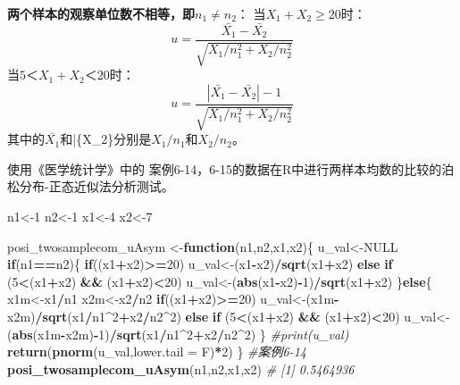 \documentclass[
]{article}
\newenvironment{Shaded}{\begin{snugshade}}{\end{snugshade}}
\newcommand{\CommentTok}[1]{\textcolor[rgb]{0.56,0.35,0.01}{\textit{#1}}}
\newcommand{\ControlFlowTok}[1]{\textcolor[rgb]{0.13,0.29,0.53}{\textbf{#1}}}
\newcommand{\DataTypeTok}[1]{\textcolor[rgb]{0.13,0.29,0.53}{#1}}
\newcommand{\DecValTok}[1]{\textcolor[rgb]{0.00,0.00,0.81}{#1}}
\newcommand{\KeywordTok}[1]{\textcolor[rgb]{0.13,0.29,0.53}{\textbf{#1}}}
\newcommand{\NormalTok}[1]{#1}
\newcommand{\OperatorTok}[1]{\textcolor[rgb]{0.81,0.36,0.00}{\textbf{#1}}}
\newcommand{\OtherTok}[1]{\textcolor[rgb]{0.56,0.35,0.01}{#1}}
\newcommand{\StringTok}[1]{\textcolor[rgb]{0.31,0.60,0.02}{#1}}
\begin{document}
\textbf{两个样本的观察单位数不相等，即\(n_1≠n_2\)}：
当\(X_1+X_2≥20\)时：
\[u=\frac{\bar{X_1}-\bar{X_2}}{\sqrt{X_1/n_1^2+X_2/n_2^2}}\]
当\(5＜X_1+X_2＜20\)时：
\[u=\frac{|\bar{X_1}-\bar{X_2}|-1}{\sqrt{X_1/n_1^2+X_2/n_2^2}}\]
其中的\(\bar{X_1}\)和\bar\{X\_2\}分别是\(X_1/n_1\)和\(X_2/n_2\)。

使用《医学统计学》中的 案例6-14，6-15的数据在R中进行两样本均数的比较的泊松分布-正态近似法分析测试。

\begin{Shaded}
\begin{Highlighting}[]
\NormalTok{n1<-}\DecValTok{1}
\NormalTok{n2<-}\DecValTok{1}
\NormalTok{x1<-}\DecValTok{4}
\NormalTok{x2<-}\DecValTok{7}

\NormalTok{posi_twosamplecom_uAsym <-}\ControlFlowTok{function}\NormalTok{(n1,n2,x1,x2)\{}
\NormalTok{  u_val<-}\OtherTok{NULL}
  \ControlFlowTok{if}\NormalTok{(n1}\OperatorTok{==}\NormalTok{n2)\{}
    \ControlFlowTok{if}\NormalTok{((x1}\OperatorTok{+}\NormalTok{x2)}\OperatorTok{>=}\DecValTok{20}\NormalTok{)}
\NormalTok{      u_val<-(x1}\OperatorTok{-}\NormalTok{x2)}\OperatorTok{/}\KeywordTok{sqrt}\NormalTok{(x1}\OperatorTok{+}\NormalTok{x2)}
    \ControlFlowTok{else} \ControlFlowTok{if}\NormalTok{ (}\DecValTok{5}\OperatorTok{<}\NormalTok{(x1}\OperatorTok{+}\NormalTok{x2) }\OperatorTok{&&}\StringTok{ }\NormalTok{(x1}\OperatorTok{+}\NormalTok{x2)}\OperatorTok{<}\DecValTok{20}\NormalTok{) }
\NormalTok{      u_val<-(}\KeywordTok{abs}\NormalTok{(x1}\OperatorTok{-}\NormalTok{x2)}\OperatorTok{-}\DecValTok{1}\NormalTok{)}\OperatorTok{/}\KeywordTok{sqrt}\NormalTok{(x1}\OperatorTok{+}\NormalTok{x2)}
\NormalTok{  \}}\ControlFlowTok{else}\NormalTok{\{}
\NormalTok{    x1m<-x1}\OperatorTok{/}\NormalTok{n1}
\NormalTok{    x2m<-x2}\OperatorTok{/}\NormalTok{n2}
     \ControlFlowTok{if}\NormalTok{((x1}\OperatorTok{+}\NormalTok{x2)}\OperatorTok{>=}\DecValTok{20}\NormalTok{)}
\NormalTok{      u_val<-(x1m}\OperatorTok{-}\NormalTok{x2m)}\OperatorTok{/}\KeywordTok{sqrt}\NormalTok{(x1}\OperatorTok{/}\NormalTok{n1}\OperatorTok{^}\DecValTok{2}\OperatorTok{+}\NormalTok{x2}\OperatorTok{/}\NormalTok{n2}\OperatorTok{^}\DecValTok{2}\NormalTok{)}
    \ControlFlowTok{else} \ControlFlowTok{if}\NormalTok{ (}\DecValTok{5}\OperatorTok{<}\NormalTok{(x1}\OperatorTok{+}\NormalTok{x2) }\OperatorTok{&&}\StringTok{ }\NormalTok{(x1}\OperatorTok{+}\NormalTok{x2)}\OperatorTok{<}\DecValTok{20}\NormalTok{) }
\NormalTok{      u_val<-(}\KeywordTok{abs}\NormalTok{(x1m}\OperatorTok{-}\NormalTok{x2m)}\OperatorTok{-}\DecValTok{1}\NormalTok{)}\OperatorTok{/}\KeywordTok{sqrt}\NormalTok{(x1}\OperatorTok{/}\NormalTok{n1}\OperatorTok{^}\DecValTok{2}\OperatorTok{+}\NormalTok{x2}\OperatorTok{/}\NormalTok{n2}\OperatorTok{^}\DecValTok{2}\NormalTok{)}
\NormalTok{  \}}
  \CommentTok{#print(u_val)}
  \KeywordTok{return}\NormalTok{(}\KeywordTok{pnorm}\NormalTok{(u_val,}\DataTypeTok{lower.tail =}\NormalTok{ F)}\OperatorTok{*}\DecValTok{2}\NormalTok{)}
\NormalTok{\}}
\CommentTok{#案例6-14}
\KeywordTok{posi_twosamplecom_uAsym}\NormalTok{(n1,n2,x1,x2)}
\CommentTok{# [1] 0.5464936}


\end{Highlighting}
\end{Shaded}
\end{document}
